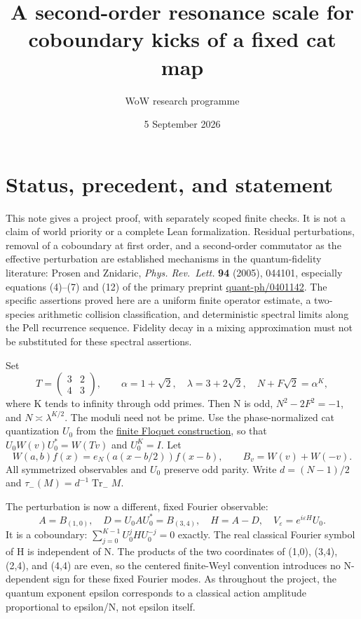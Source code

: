 \documentclass[11pt,a4paper]{article}
\title{A second-order resonance scale for\\coboundary kicks of a fixed cat map}
\author{WoW research programme}
\date{5 September 2026}
\begin{document}
\maketitle
\hypertarget{status-precedent-and-statement}{%
\section{Status, precedent, and statement}\label{status-precedent-and-statement}}

This note gives a project proof, with separately scoped finite checks. It is not a claim of world priority or a complete Lean formalization. Residual perturbations, removal of a coboundary at first order, and a second-order commutator as the effective perturbation are established mechanisms in the quantum-fidelity literature: Prosen and Znidaric, \emph{Phys. Rev.~Lett.} \textbf{94} (2005), 044101, especially equations (4)--(7) and (12) of the primary preprint \href{https://arxiv.org/abs/quant-ph/0401142}{quant-ph/0401142}. The specific assertions proved here are a uniform finite operator estimate, a two-species arithmetic collision classification, and deterministic spectral limits along the Pell recurrence sequence. Fidelity decay in a mixing approximation must not be substituted for these spectral assertions.

Set \[
 T=\begin{pmatrix}3&2\\4&3\end{pmatrix},\qquad
 \alpha=1+\sqrt2,\quad \lambda=3+2\sqrt2,\quad
 N+F\sqrt2=\alpha^K,
\] where K tends to infinity through odd primes. Then N is odd, \(N^2-2F^2=-1\), and \(N\asymp\lambda^{K/2}\). The moduli need not be prime. Use the phase-normalized cat quantization \(U_0\) from the \href{pell_floquet_normal_form.md}{finite Floquet construction}, so that \(U_0W(v)U_0^*=W(Tv)\) and \(U_0^K=I\). Let \[
 W(a,b)f(x)=e_N(a(x-b/2))f(x-b),\qquad B_v=W(v)+W(-v).
\] All symmetrized observables and \(U_0\) preserve odd parity. Write \(d=(N-1)/2\) and \(\tau_-(M)=d^{-1}\operatorname{Tr}_{-}M\).

The perturbation is now a different, fixed Fourier observable: \[
 A=B_{(1,0)},\quad D=U_0AU_0^*=B_{(3,4)},\quad
 H=A-D,\quad V_\varepsilon=e^{i\varepsilon H}U_0.                 \tag{1}
\] It is a coboundary: \(\sum_{j=0}^{K-1}U_0^jHU_0^{-j}=0\) exactly. The real classical Fourier symbol of H is independent of N. The products of the two coordinates of (1,0), (3,4), (2,4), and (4,4) are even, so the centered finite-Weyl convention introduces no N-dependent sign for these fixed Fourier modes. As throughout the project, the quantum exponent epsilon corresponds to a classical action amplitude proportional to epsilon/N, not epsilon itself.
\end{document}
